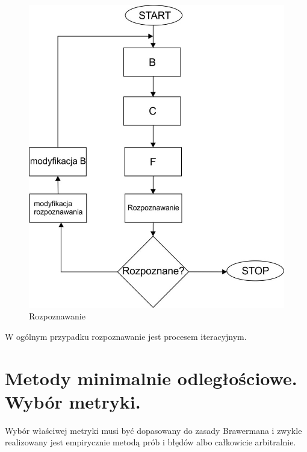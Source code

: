 \documentclass[a4paper,10pt]{article}
\begin{document}
\begin{figure}[h!]
  \centering
  \includegraphics[width=\textwidth]{rozpoznawanie.png}
  \caption{Rozpoznawanie}
  \label{fig:recognition}
\end{figure}

W ogólnym przypadku rozpoznawanie jest procesem iteracyjnym.

\section{Metody minimalnie odległościowe. Wybór metryki.}
Wybór właściwej metryki musi być dopasowany do zasady Brawermana i zwykle realizowany jest empirycznie metodą prób i błędów albo całkowicie arbitralnie.
\end{document}
